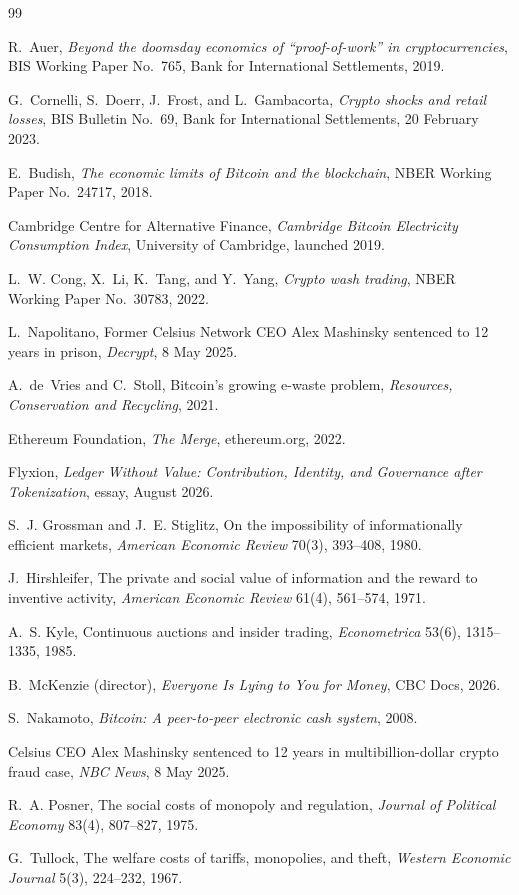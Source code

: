 \documentclass[11pt]{article}
\theoremstyle{remark}
\begin{document}
\begin{thebibliography}{99}

 R.~Auer, \emph{Beyond the doomsday economics of ``proof-of-work'' in cryptocurrencies}, BIS Working Paper No.~765, Bank for International Settlements, 2019.

 G.~Cornelli, S.~Doerr, J.~Frost, and L.~Gambacorta, \emph{Crypto shocks and retail losses}, BIS Bulletin No.~69, Bank for International Settlements, 20 February 2023.

 E.~Budish, \emph{The economic limits of Bitcoin and the blockchain}, NBER Working Paper No.~24717, 2018.

 Cambridge Centre for Alternative Finance, \emph{Cambridge Bitcoin Electricity Consumption Index}, University of Cambridge, launched 2019.

 L.~W. Cong, X.~Li, K.~Tang, and Y.~Yang, \emph{Crypto wash trading}, NBER Working Paper No.~30783, 2022.

 L.~Napolitano, Former Celsius Network CEO Alex Mashinsky sentenced to 12 years in prison, \emph{Decrypt}, 8 May 2025.

 A.~de~Vries and C.~Stoll, Bitcoin's growing e-waste problem, \emph{Resources, Conservation and Recycling}, 2021.

 Ethereum Foundation, \emph{The Merge}, ethereum.org, 2022.

 Flyxion, \emph{Ledger Without Value: Contribution, Identity, and Governance after Tokenization}, essay, August 2026.

 S.~J. Grossman and J.~E. Stiglitz, On the impossibility of informationally efficient markets, \emph{American Economic Review} 70(3), 393--408, 1980.

 J.~Hirshleifer, The private and social value of information and the reward to inventive activity, \emph{American Economic Review} 61(4), 561--574, 1971.

 A.~S. Kyle, Continuous auctions and insider trading, \emph{Econometrica} 53(6), 1315--1335, 1985.

 B.~McKenzie (director), \emph{Everyone Is Lying to You for Money}, CBC Docs, 2026.

 S.~Nakamoto, \emph{Bitcoin: A peer-to-peer electronic cash system}, 2008.

 Celsius CEO Alex Mashinsky sentenced to 12 years in multibillion-dollar crypto fraud case, \emph{NBC News}, 8 May 2025.

 R.~A. Posner, The social costs of monopoly and regulation, \emph{Journal of Political Economy} 83(4), 807--827, 1975.

 G.~Tullock, The welfare costs of tariffs, monopolies, and theft, \emph{Western Economic Journal} 5(3), 224--232, 1967.

\end{thebibliography}
\end{document}
